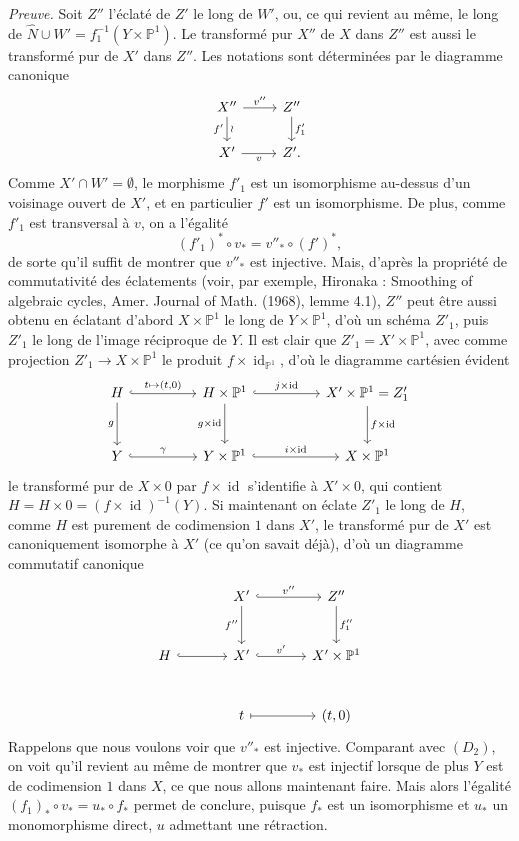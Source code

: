 \documentclass[11pt]{article}
\begin{document}
\emph{Preuve.} Soit $Z''$ l'éclaté de $Z'$ le long de $W'$, ou, ce qui revient au même, le long de $\widehat N\cup W'=f_1^{-1}(Y\times\mathbb P^1)$. Le transformé pur $X''$ de $X$ dans $Z''$ est aussi le transformé pur de $X'$ dans $Z''$. Les notations sont déterminées par le diagramme canonique
\[
\begin{tikzcd}
X''\arrow[r,"v''"]\arrow[d,"f'"',"\wr"]&Z''\arrow[d,"f'_1"]\\
X'\arrow[r,"v"']&Z'.
\end{tikzcd}
\]
Comme $X'\cap W'=\emptyset$, le morphisme $f'_1$ est un isomorphisme au-dessus d'un voisinage ouvert de $X'$, et en particulier $f'$ est un isomorphisme. De plus, comme $f'_1$ est transversal à $v$, on a l'égalité
\[
(f'_1)^*\circ v_*=v''_*\circ(f')^*,
\tag{9.8.8}
\]
de sorte qu'il suffit de montrer que $v''_*$ est injective. Mais, d'après la propriété de commutativité des éclatements (voir, par exemple, Hironaka : Smoothing of algebraic cycles, Amer. Journal of Math. (1968), lemme 4.1), $Z''$ peut être aussi obtenu en éclatant d'abord $X\times\mathbb P^1$ le long de $Y\times\mathbb P^1$, d'où un schéma $Z'_1$, puis $Z'_1$ le long de l'image réciproque de $Y$. Il est clair que $Z'_1=X'\times\mathbb P^1$, avec comme projection $Z'_1\to X\times\mathbb P^1$ le produit $f\times\operatorname{id}_{\mathbb P^1}$, d'où le diagramme cartésien évident
\[
\begin{tikzcd}[column sep=huge,row sep=large]
H\arrow[r,hook,"{t\mapsto(t,0)}"]\arrow[d,"g"']&H\times\mathbb P^1\arrow[r,hook,"{j\times\operatorname{id}}"]\arrow[d,"{g\times\operatorname{id}}"']&X'\times\mathbb P^1=Z'_1\arrow[d,"{f\times\operatorname{id}}"]\\
Y\arrow[r,hook,"\gamma"]&Y\times\mathbb P^1\arrow[r,hook,"{i\times\operatorname{id}}"]&X\times\mathbb P^1
\end{tikzcd}
\]
le transformé pur de $X\times0$ par $f\times\operatorname{id}$ s'identifie à $X'\times0$, qui contient $H=H\times0=(f\times\operatorname{id})^{-1}(Y)$. Si maintenant on éclate $Z'_1$ le long de $H$, comme $H$ est purement de codimension $1$ dans $X'$, le transformé pur de $X'$ est canoniquement isomorphe à $X'$ (ce qu'on savait déjà), d'où un diagramme commutatif canonique
\[
\begin{tikzcd}[column sep=large,row sep=large]
&X'\arrow[r,hook,"v''"]\arrow[d,"f''"']&Z''\arrow[d,"f''_1"]\\
H\arrow[r,hook]&X'\arrow[r,hook,"v'"]&X'\times\mathbb P^1\\
&t\arrow[r,mapsto]&{(t,0)}
\end{tikzcd}
\]
Rappelons que nous voulons voir que $v''_*$ est injective. Comparant avec $(D_2)$, on voit qu'il revient au même de montrer que $v_*$ est injectif lorsque de plus $Y$ est de codimension $1$ dans $X$, ce que nous allons maintenant faire. Mais alors l'égalité $(f_1)_*\circ v_*=u_*\circ f_*$ permet de conclure, puisque $f_*$ est un isomorphisme et $u_*$ un monomorphisme direct, $u$ admettant une rétraction.
\end{document}
